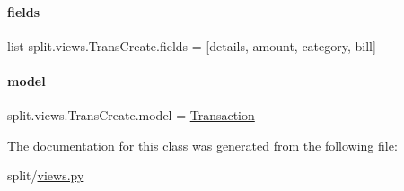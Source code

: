 \paragraph{\texorpdfstring{fields}{fields}}
{\footnotesize\ttfamily list split.\+views.\+Trans\+Create.\+fields = \mbox{[}\textquotesingle{}details\textquotesingle{}, \textquotesingle{}amount\textquotesingle{}, \textquotesingle{}category\textquotesingle{}, \textquotesingle{}bill\textquotesingle{}\mbox{]}\hspace{0.3cm}{\ttfamily [static]}}

\mbox{\label{classsplit_1_1views_1_1TransCreate_a49e18bca3ac80c3dc757e3c4cec53f36}} 
\paragraph{\texorpdfstring{model}{model}}
{\footnotesize\ttfamily split.\+views.\+Trans\+Create.\+model = \hyperlink{classtxn_1_1models_1_1Transaction}{Transaction}\hspace{0.3cm}{\ttfamily [static]}}



The documentation for this class was generated from the following file\+:\begin{DoxyCompactItemize}
\item 
split/\hyperlink{split_2views_8py}{views.\+py}\end{DoxyCompactItemize}
